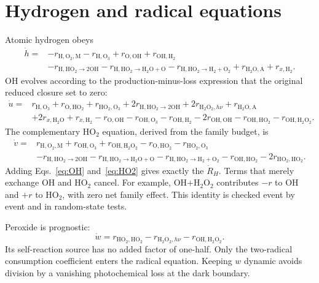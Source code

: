 \section{Hydrogen and radical equations}
Atomic hydrogen obeys
\begin{align}
\dot h={}&-r_{\mathrm{H,O_2,M}}-r_{\mathrm{H,O_3}}+r_{\mathrm{O,OH}}
+r_{\mathrm{OH,H_2}}\nonumber\\
&-r_{\mathrm{H,HO_2\to2OH}}-r_{\mathrm{H,HO_2\to H_2O+O}}
-r_{\mathrm{H,HO_2\to H_2+O_2}}
+r_{\mathrm{H_2O,A}}+r_{x,\mathrm{H_2}}.
\label{eq:H}
\end{align}
OH evolves according to the production-minus-loss expression that the original reduced closure set to zero:
\begin{align}
\dot u={}&r_{\mathrm{H,O_3}}+r_{\mathrm{O,HO_2}}+r_{\mathrm{HO_2,O_3}}
+2r_{\mathrm{H,HO_2\to2OH}}+2r_{\mathrm{H_2O_2},h\nu}
+r_{\mathrm{H_2O,A}}\nonumber\\
&+2r_{x,\mathrm{H_2O}}+r_{x,\mathrm{H_2}}
-r_{\mathrm{O,OH}}-r_{\mathrm{OH,O_3}}-r_{\mathrm{OH,H_2}}
-2r_{\mathrm{OH,OH}}-r_{\mathrm{OH,HO_2}}-r_{\mathrm{OH,H_2O_2}}.
\label{eq:OH}
\end{align}
The complementary HO$_2$ equation, derived from the family budget, is
\begin{align}
\dot v={}&r_{\mathrm{H,O_2,M}}+r_{\mathrm{OH,O_3}}+r_{\mathrm{OH,H_2O_2}}
-r_{\mathrm{O,HO_2}}-r_{\mathrm{HO_2,O_3}}\nonumber\\
&-r_{\mathrm{H,HO_2\to2OH}}-r_{\mathrm{H,HO_2\to H_2O+O}}
-r_{\mathrm{H,HO_2\to H_2+O_2}}
-r_{\mathrm{OH,HO_2}}-2r_{\mathrm{HO_2,HO_2}}.
\label{eq:HO2}
\end{align}
Adding Eqs.~\eqref{eq:OH} and~\eqref{eq:HO2} gives exactly the $\dot R_H$. Terms that merely exchange OH and HO$_2$ cancel. For example, OH+H$_2$O$_2$ contributes $-r$ to OH and $+r$ to HO$_2$, with zero net family effect. This identity is checked event by event and in random-state tests.

Peroxide is prognostic:
\begin{equation}\dot w=r_{\mathrm{HO_2,HO_2}}-r_{\mathrm{H_2O_2},h\nu}-r_{\mathrm{OH,H_2O_2}}.
\label{eq:H2O2}\end{equation}
Its self-reaction source has no added factor of one-half. Only the two-radical consumption coefficient enters the radical equation. Keeping $w$ dynamic avoids division by a vanishing photochemical loss at the dark boundary.

